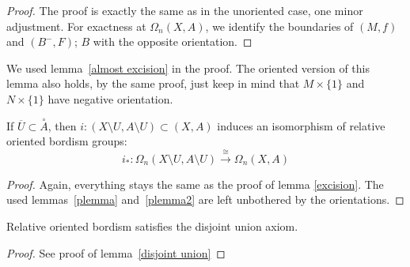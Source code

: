 \documentclass[a4paper,11pt]{article}
\begin{document}
\begin{proof}\cite{conner}
    The proof is exactly the same as in the unoriented case, one minor adjustment. For exactness at \(\Omega_n(X,A)\), we identify the boundaries of \((M,f)\) and \((B^-,F)\); \(B\) with the opposite orientation.
\begin{comment}
    \begin{itemize}
        \item \textbf{Exactness at \(\Omega_n(A)\)}: \(i_\ast\circ\partial=0\), as \((M,f)\) is a nullbordism for \(i_\ast\circ\partial(M,f)=\partial(M,f)\)\\
        For a nullbordism \((B,g)\) of \(M,f\), \(\partial(B,g)=(M,f)\).
        \item \textbf{Exactness at \(\Omega_n(X)\)}: 
        \(j_\ast\circ i_\ast=0\) exactly as in the unoriented case.

        \item \textbf{Exactness at \(\Omega_n(X,A)\)}: 
    \end{itemize}
\end{comment}
\end{proof}

\begin{remark}
    We used lemma\ \ref{almost excision} in the proof. The oriented version of this lemma also holds, by the same proof, just keep in mind that \(M\times\{1\}\) and \(N\times\{1\}\) have negative orientation.
\end{remark}

\begin{lemma}
    If \(\overline{U}\subset\overset{\circ}{A}\), then \(i:(X\setminus U, A\setminus U)\subset (X,A)\) induces an isomorphism of relative oriented bordism groups:
    \[i_\ast:\Omega_n(X\setminus U,A\setminus U)\xrightarrow{\cong}\Omega_n(X,A)\]
\end{lemma}

\begin{proof}\cite{conner}
    Again, everything stays the same as the proof of lemma \ref{excision}. The used lemmas\ \ref{plemma} and\ \ref{plemma2} are left unbothered by the orientations.
\end{proof}

\begin{lemma}
    Relative oriented bordism satisfies the disjoint union axiom.
\end{lemma}

\begin{proof}
    See proof of lemma\ \ref{disjoint union}
\end{proof}
\end{document}
